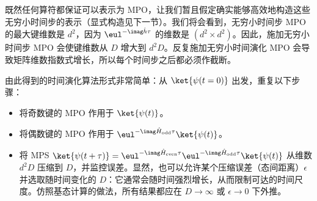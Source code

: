 既然任何算符都保证可以表示为 MPO，让我们暂且假定确实能够高效地构造这些无穷小时间步的表示（显式构造见下一节）。我们将会看到，无穷小时间步 MPO 的最大键维数是 $d^2$，因为 $\eul^{-\imag \hat{h} \tau}$ 的维数是 $(d^2 \times d^2)$。因此，施加无穷小时间步 MPO 会使键维数从 $D$ 增大到 $d^2 D$。反复施加无穷小时间演化 MPO 会导致矩阵维数指数式增长，所以每个时间步之后都必须作截断。

由此得到的时间演化算法形式非常简单：从 $\ket{\psi(t=0)}$ 出发，重复以下步骤：
\begin{itemize}
\item 将奇数键的 MPO 作用于 $\ket{\psi(t)}$。
\item 将偶数键的 MPO 作用于 $\eul^{-\imag \hat{H}_{{\rm odd}}\tau}\ket{\psi(t)}$。
\item 将 MPS $\ket{\psi(t+\tau)}=\eul^{-\imag \hat{H}_{{\rm even}}\tau}\eul^{-\imag \hat{H}_{{\rm odd}}\tau}\ket{\psi(t)}$ 从维数 $d^2 D$ 压缩到 $D$，并监控误差。显然，也可以允许某个压缩误差（态间距离）$\epsilon$ 并选取随时间变化的 $D$：它通常会随时间强烈增长，从而限制可达的时间尺度。仿照基态计算的做法，所有结果都应在 $D\rightarrow\infty$ 或 $\epsilon\rightarrow 0$ 下外推。
\end{itemize}

